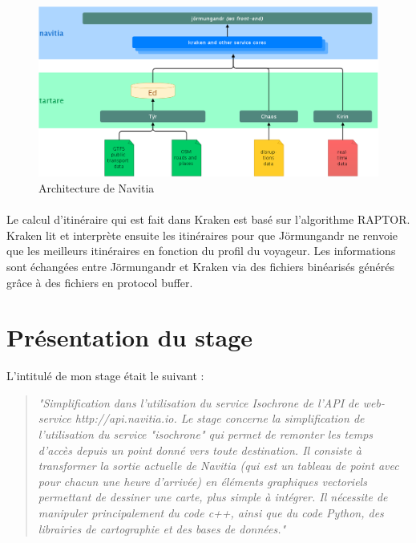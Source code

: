 \documentclass[a4paper]{report}
\begin{document}
\begin{figure}[H]
	\begin{center}
		\includegraphics[width=400pt]{image/architecture_navitia}
		\caption{Architecture de Navitia}
		\label{Architecture de Navitia}
	\end{center}
\end{figure}

\paragraph{} Le calcul d'itinéraire qui est fait dans Kraken est basé sur l'algorithme RAPTOR. Kraken lit et interprète ensuite les itinéraires pour que Jörmungandr ne renvoie que les meilleurs itinéraires en fonction du profil du voyageur. Les informations sont échangées entre Jörmungandr et Kraken via des fichiers binéarisés générés grâce à des fichiers en protocol buffer.

\section{Présentation du stage}

L'intitulé de mon stage était le suivant :

\begin{quote}
	\emph{"Simplification dans l’utilisation du service Isochrone de l’API de web-service http://api.navitia.io. Le stage concerne la simplification de l’utilisation du service 		"isochrone" qui permet de remonter les temps d'accès depuis un point donné vers toute destination. Il consiste à transformer la sortie actuelle de Navitia (qui est un tableau de 		point avec pour chacun une heure d'arrivée) en éléments graphiques vectoriels permettant de dessiner une carte, plus simple à intégrer. Il nécessite de manipuler principalement du 		code c++, ainsi que du code Python, des librairies de cartographie et des bases de données."}
\end{quote}
\end{document}

